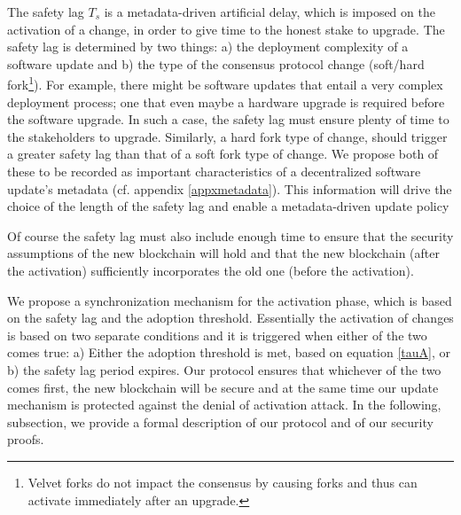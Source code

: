 The safety lag $T_s$ is a metadata-driven artificial delay, which is imposed on the activation of a change, in order to give time to the honest stake to upgrade. The safety lag is determined by two things: a) the deployment complexity of a software update and b) the type of the consensus protocol change (soft/hard fork\footnote{Velvet forks \cite{velvet} do not impact the consensus by causing forks and thus can activate immediately after an upgrade.}). For example, there might be software updates that entail a very complex deployment process; one that even maybe a hardware upgrade is required before the software upgrade. In such a case, the safety lag must ensure plenty of time to the stakeholders to upgrade. Similarly, a hard fork type of change, should trigger a greater safety lag than that of a soft fork type of change. We propose both of these to be recorded as important characteristics of a decentralized software update's metadata (cf. appendix \ref{appxmetadata}). This information will drive the choice of the length of the safety lag and enable a metadata-driven update policy

Of course the safety lag must also include enough time to ensure that the security assumptions of the new blockchain will hold and that the new blockchain (after the activation) sufficiently incorporates the old one (before the activation).

We propose a synchronization mechanism for the activation phase, which is based on the safety lag and the adoption threshold. Essentially the activation of changes is based on two separate conditions and it is triggered when either of the two comes true: a) Either the adoption threshold is met, based on equation \ref{tauA}, or b) the safety lag period expires. Our protocol ensures that whichever of the two comes first, the new blockchain will be secure and at the same time our update mechanism is protected against the denial of activation attack. In the following, subsection, we provide a formal description of our protocol and of our security proofs.

